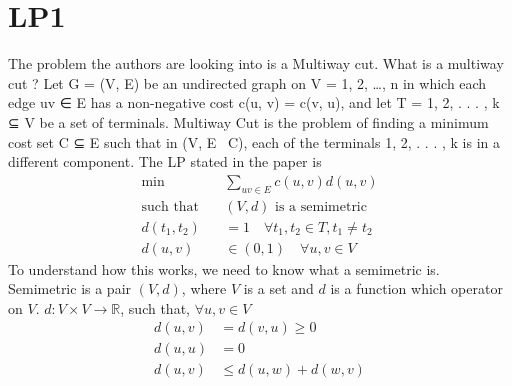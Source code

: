 \documentclass[11pt]{article}
\begin{document}
\section{LP1}
The problem the authors are looking into is a Multiway cut. What is a multiway cut ? Let G = (V, E) be an undirected graph on V = {1, 2, \dots, n} in which each edge uv ∈ E has a non-negative cost c(u, v) = c(v, u), and let T = {1, 2, . . . , k} ⊆ V be a set of terminals. Multiway Cut is the problem of finding a minimum cost set C ⊆ E such that in (V, E \ C), each of the terminals 1, 2, . . . , k is in a different component.
The LP stated in the paper is 
\begin{align}
    \min \quad & \sum\limits_{uv \in E}{c(u, v)d(u, v)}\\
        \text{such that}\quad & (V,d) \text{ is a semimetric}\\
        d(t_1, t_2) &= 1 \quad \forall t_1, t_2 \in T, t_1 \neq t_2\\
        d(u, v) &\in (0,1) \quad \forall u, v \in V
\end{align}
To understand how this works, we need to know what a semimetric is. Semimetric is a pair $(V, d)$, where $V$ is a set and $d$ is a function which operator on $V$. $d: V \times V \rightarrow \mathbb{R}$, such that, 
$\forall u,v \in V$
\begin{align}
d(u, v) &= d(v, u) \ge 0 \\
d(u, u) &= 0\\
d(u,v) &\le d(u,w) + d(w,v) 
\end{align}
\end{document}
